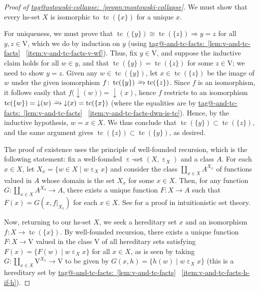 \documentclass{amsart}
\makeatletter
\newcommand\dwnfn{{\downarrow}}
\newcommand\ein{\mathrel{\varepsilon}}
\newcommand\pbig[1]{\big({#1}\big)}
\newcommand\rstr[2]{{\left.#1\right|_{#2}}}
\newcommand\rV{\mathrm{V}}
\newcommand\set[2][]{#1\{ #2 #1\}}
\newcommand\tc{\operatorname{tc}}
\newcommand\toi{\xrightarrow{\raisebox{-2.5pt}[0pt][0pt]{\ensuremath{\scriptstyle{\sim}}}}}
\newcommand\To{\Rightarrow}
\newcommand\unein{{\ein}}
\newcommand\tagword[1]{\csname tag@#1\endcsname}
\def\label@tag#1:#2\@nil{#1}
\newcommand\labeltag[1]{\label@tag#1:\@nil}
\newcommand\jref[1]{%
  \texorpdfstring%
    {\hyperref[#1]{\tagword{\labeltag{#1}}~\ref*{#1}}}%
    {\tagword{\labeltag{#1}}~\ref*{#1}}%
}
\theoremstyle{definition}
\theoremstyle{remark}
\theoremstyle{plainwithref}
\newenvironment{settybox}{\begin{tcolorbox}[colback=blue!20,breakable%
    ,enhanced%
    ,sharp corners%
    ,frame hidden%
    ,boxsep=0pt
    ,left=5pt,right=5pt,top=5pt,bottom=5pt
    ,enlarge left by=-5pt,width=\linewidth+10pt
    ,enlarge top by=5pt,enlarge bottom by=5pt
    ,before skip balanced=0pt,after skip balanced=0pt
    ]}{\end{tcolorbox}}
\makeatother
\begin{document}
\begin{settybox}
  \begin{proof}[Proof of \jref{propn:mostowski-collapse}] \label{proof:mostowski-collapse}
    We must show that every hs-set \( X \) is isomorphic to \( \tc(\set{x}) \) for a unique \( x \).

    For uniqueness, we must prove that \( \tc(\set{y}) \cong \tc(\set{z}) \To y = z \) for all \( y, z \in \rV \), which we do by induction on \( y \) (using \jref{lem:v-and-tc-facts}~\ref{item:v-and-tc-facts-v-wf}).
    Thus, fix \( y \in \rV \), and suppose the inductive claim holds for all \( w \in y \), and that \( \tc(\set{y}) = \tc(\set{z}) \) for some \( z \in \rV \); we need to show \( y = z \).
    Given any \( w \in \tc(\set{y}) \), let \( x \in \tc(\set{z}) \) be the image of \( w \) under the given isomorphism \( f \colon \tc(\set{y}) \toi \tc(\set{z}) \).
    Since \( f \) is an isomorphism, it follows easily that \( f\pbig{\dwnfn(w)} = \dwnfn(x) \), hence \( f \) restricts to an isomorphism \( \tc(\set{w}) = \dwnfn(w) \toi \dwnfn(x) = \tc(\set{x}) \) (where the equalities are by \jref{lem:v-and-tc-facts}~\ref{item:v-and-tc-facts-dwn-is-tc}).
    Hence, by the inductive hypothesis, \( w = x \in X \).
    We thus conclude that \( \tc(\set{y}) \subset \tc(\set{z}) \), and the same argument gives \( \tc(\set{z}) \subset \tc(\set{y}) \), as desired.

    The proof of existence uses the principle of well-founded recursion, which is the following statement: fix a well-founded \( \unein \)-set \( (X, \ein_X) \) and a class \( A \).
    For each \( x \in X \), let \( X_x = \set{ w \in X \mid w \ein_X x } \) and consider the class \( \coprod_{x \in X} A^{X_x} \) of functions valued in \( A \) whose domain is the set \( X_x \) for some \( x \in X \).
    Then, for any function \( G \colon \coprod_{x \in X} A^{X_x} \to A \), there exists a unique function \( F \colon X \to A \) such that \( F(x) = G(x, \rstr{f}{X_x}) \) for each \( x \in X \).
    See \cite[Theorem~1.2.9]{nashaat-powell-valued-models} for a proof in intuitionistic set theory.

    Now, returning to our hs-set \( X \), we seek a hereditary set \( x \) and an isomorphism \( f \colon X \to \tc(\set{x}) \).
    By well-founded recursion, there exists a unique function \( F \colon X \to \rV \) valued in the class \( \rV \) of all hereditary sets satisfying \( F(x) = \set{ F(w) \mid w \ein_X x } \) for all \( x \in X \), as is seen by taking \( G \colon \coprod_{x \in X} \rV^{X_x} \to \rV \) to be given by \( G(x, h) = \set{ h(w) \mid w \ein_X x } \) (this is a hereditary set by \jref{lem:v-and-tc-facts}~\ref{item:v-and-tc-facts-h-if-h}).


\end{proof}
\end{settybox}
\end{document}
